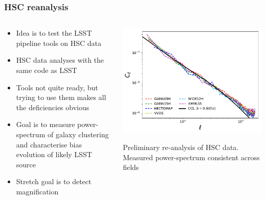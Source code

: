 \documentclass{beamer}
\begin{document}
\begin{frame}
  \frametitle{HSC reanalysis}

  \begin{columns}
    \begin{column}{5cm}
      \begin{itemize}
      \item Idea is to test the LSST pipeline tools on HSC data
      \item HSC data analyses with the same code as LSST
      \item Tools not quite ready, but trying to use them makes all
        the deficiencies obvious
      \item Goal is to measure power-spectrum of galaxy clustering and
        characterise bias evolution of likely LSST source
      \item Stretch goal is to detect magnification
      \end{itemize}
    \end{column}
    \begin{column}{6cm}
      \includegraphics[width=\linewidth]{./cls_hsc.pdf}
      \begin{center}
        \scriptsize Preliminary re-analysis of HSC data. Measured
        power-spectrum consistent across fields 
      \end{center}

    \end{column}
  \end{columns}


\end{frame}
\end{document}
